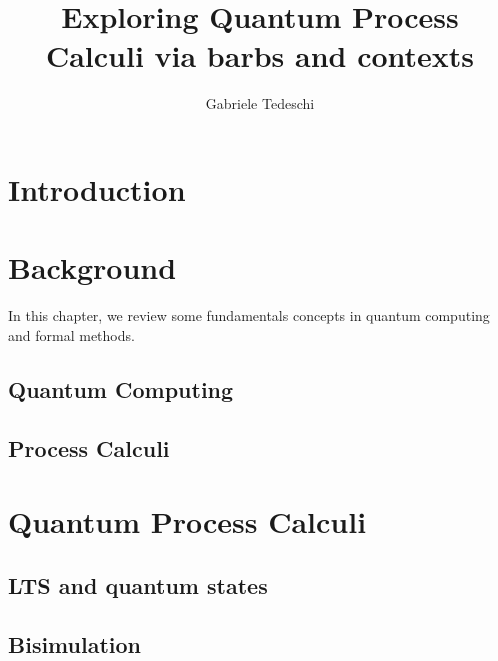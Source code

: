 \documentclass[10pt,a4paper, titlepage]{report}
\title{Exploring Quantum Process Calculi via barbs and contexts }
\author{Gabriele Tedeschi}
\begin{document}
\maketitle

\tableofcontents

\chapter{Introduction}

\chapter{Background}
In this chapter, we review some fundamentals concepts in quantum computing and formal methods.

\section{Quantum Computing}


\section{Process Calculi}	





\chapter{Quantum Process Calculi}



\section{LTS and quantum states}


\section{Bisimulation}

\end{document}
